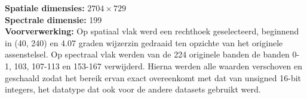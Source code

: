 \textbf{Spatiale dimensies:} $2704 \times 729$\\
\textbf{Spectrale dimensie:} 199\\
\textbf{Voorverwerking:} Op spatiaal vlak werd een rechthoek geselecteerd, beginnend in (40, 240) en 4.07 graden wijzerzin gedraaid ten opzichte van het originele assenstelsel. Op spectraal vlak werden van de 224 originele banden de banden 0-1, 103, 107-113 en 153-167 verwijderd. Hierna werden alle waarden verschoven en geschaald zodat het bereik ervan exact overeenkomt met dat van unsigned 16-bit integers, het datatype dat ook voor de andere datasets gebruikt werd.